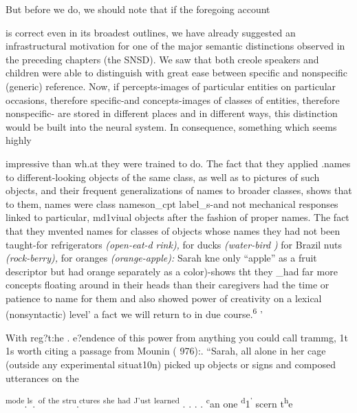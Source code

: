 But before we do, we should note that if the foregoing account

is correct even in its broadest outlines, we have already suggested an infrastructural motivation for one of the major semantic distinctions observed in the preceding chapters (the SNSD). We saw that both creole speakers and children were able to distinguish with great ease between specific and nonspecific (generic) reference. Now, if percepts-images of particular entities on particular occasions, therefore specific-and concepts-images of classes of entities, therefore nonspecific- are stored in different places and in different ways, this distinction would be built into the neural system. In consequence, something which seems highly


impressive than wh.at they were trained to do. The fact that they applied .names to different-looking objects of the same class, as well as to pictures of such objects, and their frequent generalizations of names to broader classes, shows that to them, names were class names\-on\_cpt label\_s-and not mechanical responses linked to particular, md1viual objects after the fashion of proper names. The fact that they mvented names for classes of objects whose names they had not been taught-for refrigerators \textit{(open-eat-d} \textit{rink),} for ducks \textit{(water-bird} \textit{)} for Brazil nuts \textit{(roc}\textit{k}\textit{{}-berr}\textit{y}\textit{), }for oranges \textit{(orange-apple):} Sarah kne only ``apple'' as a fruit descriptor but had orange separately as a co\-lor)-shows tht they \_had far more concepts floating around in their heads than their caregivers had the time or patience to name for them and also showed power of creativity on a lexical (nonsyntactic) level' a fact we will return to in due course.\textsuperscript{6 }'

With reg?t:he . e?endence of this power from anything you could call trammg, 1t 1s worth citing a passage from Mounin ( 976):. ``Sarah, all alone in her cage (outside any experimental situa\-t10n) picked up objects or signs and composed utterances on the

\textsuperscript{mod}\textsuperscript{e}.\textsuperscript{l}\textsuperscript{s}. \textsuperscript{of} \textsuperscript{the} \textsuperscript{str}\textsuperscript{u}.\textsuperscript{ctures} \textsuperscript{she} \textsuperscript{had} \textsuperscript{J}\textsuperscript{'ust} \textsuperscript{learned} . . . . \textsuperscript{c}an one \textsuperscript{d}1\textsuperscript{'} scern t\textsuperscript{h}e

